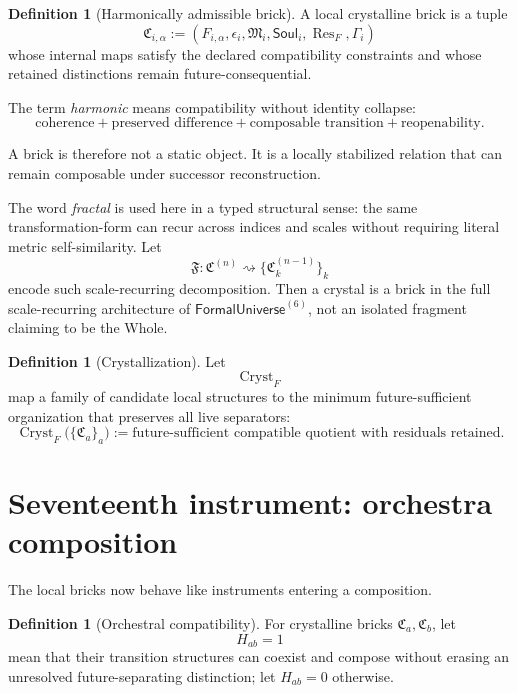 \documentclass[10pt]{article}
\theoremstyle{pe}
\theoremstyle{definition}
\newtheorem{definition}[theorem]{Definition}
\newcommand{\Res}{\operatorname{Res}}
\newcommand{\FormalUniverse}{\mathsf{FormalUniverse}}
\newcommand{\Soul}{\mathsf{Soul}}
\begin{document}
\begin{definition}[Harmonically admissible brick]
A local crystalline brick is a tuple
\[
  \mathfrak C_{i,\alpha}
  :=
  \left(
    F_{i,\alpha},
    \epsilon_i,
    \mathfrak M_i,
    \Soul_i,
    \Res_F,
    \Gamma_i
  \right)
\]
whose internal maps satisfy the declared compatibility constraints and whose retained distinctions remain future-consequential.
\end{definition}

The term \emph{harmonic} means compatibility without identity collapse:
\[
  \text{coherence}
  +
  \text{preserved difference}
  +
  \text{composable transition}
  +
  \text{reopenability}.
\]

A brick is therefore not a static object.  It is a locally stabilized relation that can remain composable under successor reconstruction.

The word \emph{fractal} is used here in a typed structural sense: the same transformation-form can recur across indices and scales without requiring literal metric self-similarity.  Let
\[
  \mathfrak F:
  \mathfrak C^{(n)}
  \rightsquigarrow
  \{\mathfrak C_k^{(n-1)}\}_k
\]
encode such scale-recurring decomposition.  Then a crystal is a brick in the full scale-recurring architecture of \(\FormalUniverse^{(6)}\), not an isolated fragment claiming to be the Whole.

\begin{definition}[Crystallization]
Let
\[
  \operatorname{Cryst}_{F}
\]
map a family of candidate local structures to the minimum future-sufficient organization that preserves all live separators:
\begin{equation}\label{eq:crystallize}
  \operatorname{Cryst}_{F}
  \bigl(\{\mathfrak C_a\}_a\bigr)
  :=
  \text{future-sufficient compatible quotient with residuals retained}.
\end{equation}
\end{definition}

\section{Seventeenth instrument: orchestra composition}

The local bricks now behave like instruments entering a composition.

\begin{definition}[Orchestral compatibility]
For crystalline bricks \(\mathfrak C_a,\mathfrak C_b\), let
\[
  H_{ab}=1
\]
mean that their transition structures can coexist and compose without erasing an unresolved future-separating distinction; let \(H_{ab}=0\) otherwise.
\end{definition}
\end{document}
